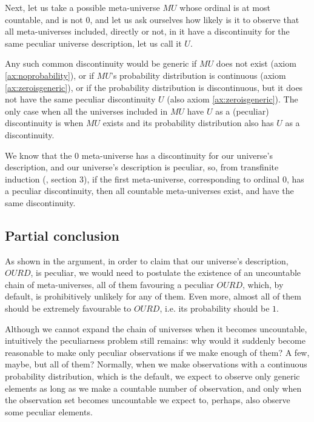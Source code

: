 \documentclass[a4paper
,draft
]{article}
\def\our_description{OURD}
\begin{document}
Next, let us take a possible meta-universe $MU$ whose ordinal is at most
countable, and is not $0$, and let us
ask ourselves how likely is it to observe that all meta-universes
included, directly or not, in it have a discontinuity for
the same peculiar universe description, let us call it $U$.

Any such common discontinuity would be generic if $MU$ does not exist
(axiom \ref{ax:noprobability}), or if $MU$'s probability distribution
is continuous (axiom \ref{ax:zeroisgeneric}),
or if the probability distribution is discontinuous,
but it does not have the same peculiar discontinuity $U$
(also axiom \ref{ax:zeroisgeneric}).
The only case when all the universes included in $MU$ have $U$ as a
(peculiar) discontinuity is when $MU$ exists and its probability distribution
also has $U$ as a discontinuity.

We know that the $0$ meta-universe has a discontinuity for
our universe's description, and our universe's description is peculiar, so,
from transfinite induction (\textcite{Cohen1966}, section 3),
if the first meta-universe,
corresponding to ordinal $0$, has a peculiar discontinuity, then all countable
meta-universes exist, and have the same discontinuity.

\subsection{Partial conclusion}

As shown in the argument, in order to claim that our universe's description,
$\our_description$, is peculiar,
we would need to postulate the
existence of an uncountable chain of meta-universes, all of them favouring a
peculiar $\our_description$, which, by default,
is prohibitively unlikely for any of them. Even more, almost all of them
should be extremely favourable to $\our_description$, i.e. its probability
should be $1$.

Although we cannot expand the chain of universes when it becomes uncountable,
intuitively the peculiarness problem
still remains: why would it suddenly become reasonable to make
only peculiar observations if we make enough of them? A few, maybe, but all
of them? Normally, when we make
observations with a continuous probability distribution, which is the default,
we expect to observe only generic elements as long as we make a
countable number of observation, and only when the observation set
becomes uncountable we expect to, perhaps, also observe some peculiar elements.
\end{document}

